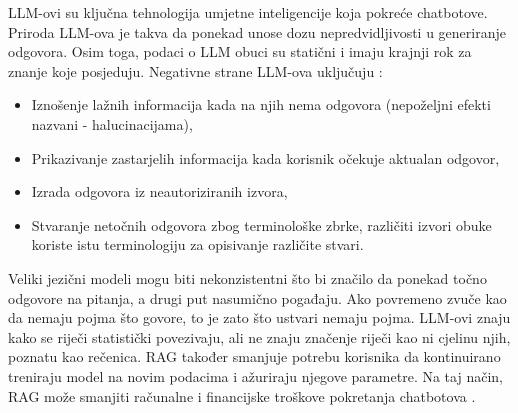 \documentclass[]{foi}
\begin{document}
LLM-ovi su ključna tehnologija umjetne inteligencije koja pokreće chatbotove. Priroda LLM-ova je takva da ponekad unose dozu nepredvidljivosti
u generiranje odgovora. Osim toga, podaci o LLM obuci su statični i imaju krajnji rok za znanje koje posjeduju. Negativne strane LLM-ova uključuju \cite{awsRAG2025}:

\begin{itemize}
    \item Iznošenje lažnih informacija kada na njih nema odgovora (nepoželjni efekti nazvani - halucinacijama), 
    \item Prikazivanje zastarjelih informacija kada korisnik očekuje aktualan odgovor,
    \item Izrada odgovora iz neautoriziranih izvora,
    \item Stvaranje netočnih odgovora zbog terminološke zbrke, različiti izvori obuke koriste istu terminologiju za opisivanje različite stvari.
\end{itemize}

Veliki jezični modeli mogu biti nekonzistentni što bi značilo da ponekad točno odgovore na pitanja, a drugi put nasumično pogađaju. Ako povremeno zvuče kao da nemaju pojma što govore, 
to je zato što ustvari nemaju pojma. LLM-ovi znaju kako se riječi statistički povezivaju, ali ne znaju značenje riječi kao ni cjelinu njih, poznatu kao rečenica. RAG također smanjuje potrebu 
korisnika da kontinuirano treniraju model na novim podacima i ažuriraju njegove parametre. Na taj način, RAG može smanjiti računalne i financijske troškove pokretanja chatbotova \cite{ibmRAG}.
\newpage
\end{document}
